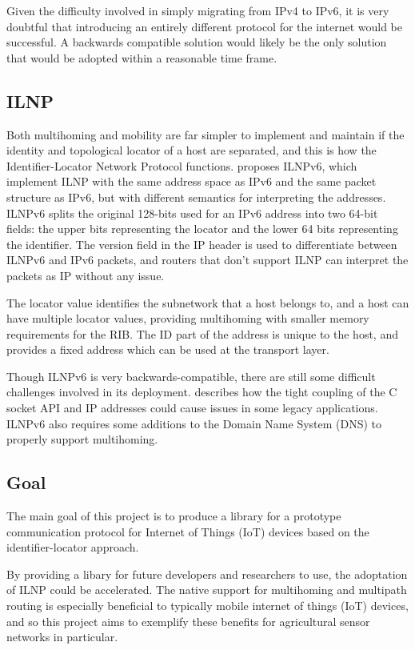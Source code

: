\documentclass[12pt]{article}
\begin{document}
Given the difficulty involved in simply migrating from IPv4 to IPv6, it is very doubtful that introducing an entirely different protocol for the internet would be successful. A backwards compatible solution would likely be the only solution that would be adopted within a reasonable time frame.

\subsection{ILNP}

Both multihoming and mobility are far simpler to implement and maintain if the identity and topological locator of a host are separated, and this is how the Identifier-Locator Network Protocol functions. \cite{5586444} proposes ILNPv6, which implement ILNP with the same address space as IPv6 and the same packet structure as IPv6, but with different semantics for interpreting the addresses. ILNPv6 splits the original 128-bits used for an IPv6 address into two 64-bit fields: the upper bits representing the locator and the lower 64 bits representing the identifier. The version field in the IP header is used to differentiate between ILNPv6 and IPv6 packets, and routers that don't support ILNP can interpret the packets as IP without any issue. 

The locator value identifies the subnetwork that a host belongs to, and a host can have multiple locator values, providing multihoming with smaller memory requirements for the RIB. The ID part of the address is unique to the host, and provides a fixed address which can be used at the transport layer.

Though ILNPv6 is very backwards-compatible, there are still some difficult challenges involved in its deployment. \cite{ipwithoutip} describes how the tight coupling of the C socket API and IP addresses could cause issues in some legacy applications. ILNPv6 also requires some additions to the Domain Name System (DNS) to properly support multihoming.

\subsection{Goal}

The main goal of this project is to produce a library for a prototype communication
protocol for Internet of Things (IoT) devices based on the identifier-locator
approach. 

By providing a libary for future developers and researchers to use, the adoptation of ILNP could be accelerated. The native support for multihoming and multipath routing is especially beneficial to typically mobile internet of things (IoT) devices, and so this project aims to exemplify these benefits for agricultural sensor networks in particular. 
\end{document}
